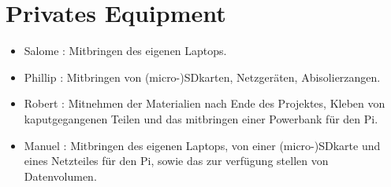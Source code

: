 \documentclass{article}
\begin{document}
\section{Privates Equipment}

\begin{itemize}

\item Salome : Mitbringen des eigenen Laptops.

\item Phillip : Mitbringen von (micro-)SDkarten, Netzgeräten, Abisolierzangen.

\item Robert : Mitnehmen der Materialien nach Ende des Projektes, Kleben von kaputgegangenen Teilen und das mitbringen einer Powerbank für den Pi. 

\item Manuel : Mitbringen des eigenen Laptops, von einer (micro-)SDkarte und eines Netzteiles für den Pi, sowie das zur verfügung stellen von Datenvolumen.

\end{itemize}
\end{document}
